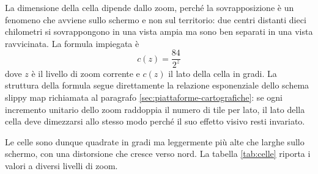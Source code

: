 La dimensione della cella dipende dallo zoom, perché la sovrapposizione è un fenomeno che avviene sullo schermo e non sul territorio:
due centri distanti dieci chilometri si sovrappongono in una vista ampia ma sono ben separati in una vista ravvicinata.
La formula impiegata è
\begin{equation}
c(z) = \frac{84}{2^{z}}
\label{eq:cella}
\end{equation}
dove $z$ è il livello di zoom corrente e $c(z)$ il lato della cella in gradi.
La struttura della formula segue direttamente la relazione esponenziale dello schema slippy map richiamata al
paragrafo \ref{sec:piattaforme-cartografiche}: se ogni incremento unitario dello zoom raddoppia il numero di tile per
lato, il lato della cella deve dimezzarsi allo stesso modo perché il suo effetto visivo resti invariato.


%
Le celle sono dunque quadrate in gradi ma leggermente più alte che larghe sullo schermo, con una distorsione che cresce verso nord.
La tabella \ref{tab:celle} riporta i valori a diversi livelli di zoom.

